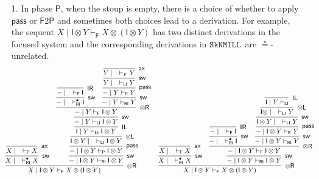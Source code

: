 \documentclass[copyright,creativecommons]{eptcs}
\theoremstyle{definition}
\newcommand{\tl}{\otimes \mathsf{L}}
\newcommand{\tr}{\otimes \mathsf{R}}
\newcommand{\pass}{\mathsf{pass}}
\newcommand{\unitl}{\mathsf{IL}}
\newcommand{\unitr}{\mathsf{IR}}
\newcommand{\ax}{\mathsf{ax}}
\newcommand{\ot}{\otimes}
\newcommand{\I}{\mathsf{I}}
\newcommand{\RI}{\mathsf{RI}}
\newcommand{\LI}{\mathsf{LI}}
\newcommand{\Pass}{\mathsf{P}}
\newcommand{\F}{\mathsf{F}}
\newcommand{\SkNMILL}{$\mathtt{SkNMILL}$}
\begin{document}
\begin{enumerate}
  \item[1.] In phase $\Pass$, when the stoup is empty, there is a choice of whether to apply $\pass$ or $\F2\Pass$ and sometimes both choices lead to a derivation. For example, the sequent $X \mid \I \ot Y \vdash_{\F} X \ot (\I \ot Y)$ has two distinct derivations in the focused system and the corresponding derivations in \SkNMILL\ are $\circeq$-unrelated.
  \begin{equation*}
  \small
\hspace*{-5mm}
    \begin{array}{cc}
    \infer[\tr]{X \mid \I \ot Y \vdash_{\F} X \ot (\I \ot Y)}{
    \infer[\mathsf{sw}]{X \mid \quad \vdash^{\bullet}_{\RI} X}{
      \infer[\ax]{X \mid \quad \vdash_{\F} X}{}
    }
      &
      \infer[\mathsf{sw}]{{-} \mid \I \ot Y \vdash_{\RI} \I \ot Y}{
        \infer[\pass]{{-} \mid \I \ot Y \vdash_{\Pass} \I \ot Y}{
          \infer[\tl]{\I \ot Y \mid \quad \vdash_{\LI} \I \ot Y}{
            \infer[\unitl]{\I \mid Y \vdash_{\LI} \I \ot Y}{
              \infer[\mathsf{sw}]{{-} \mid Y \vdash_{\LI} \I \ot Y}{
                \infer[\tr]{{-} \mid Y \vdash_{\F} \I \ot Y}{
                  \infer[\mathsf{sw}]{{-} \mid \quad \vdash^{\bullet}_{\RI} \I}{
                    \infer[\unitr]{{-} \mid \quad \vdash_{\F} \I}{}
                  }
                  &
                  \infer[\mathsf{sw}]{{-} \mid Y \vdash_{\RI} Y}{
                    \infer[\pass]{{-} \mid Y \vdash_{\Pass} Y}{
                      \infer[\mathsf{sw}]{Y \mid \quad \vdash_{\LI} Y}{
                        \infer[\ax]{Y \mid \quad \vdash_{F} Y}{}
                      }
                    }
                  }
                }
              }
            }
          }
        }
      }
    }
    &
    \infer[\tr]{X \mid \I \ot Y \vdash_{\F} X \ot (\I \ot Y)}{
      \infer[\mathsf{sw}]{X \mid \quad \vdash^{\bullet}_{\RI} X}{
        \infer[\ax]{X \mid \quad \vdash_{\F} X}{}
      }
      &
      \infer[\mathsf{sw}]{{-} \mid \I \ot Y \vdash_{\RI} \I \ot Y}{
        \infer[\tr]{{-} \mid \I \ot Y \vdash_{\F} \I \ot Y}{
          \infer[\mathsf{sw}]{{-} \mid \quad \vdash^{\bullet}_{\RI} \I}{
            \infer[\unitr]{{-} \mid \quad \vdash_{\F} \I}{}
          }
          &
          \infer[\mathsf{sw}]{{-} \mid \I \ot Y \vdash_{\RI} Y}{
            \infer[\pass]{{-} \mid \I \ot Y \vdash_{\Pass} Y}{
              \infer[\mathsf{sw}]{\I \ot Y \mid \quad \vdash_{\LI} Y}{
                \infer[\tl]{\I \ot \mid \quad \vdash_{\LI} Y}{
                  \infer[\unitl]{\I \mid Y \vdash_{\LI}}{
}}}}}}}}
\end{array}
\end{equation*}
\end{enumerate}
\end{document}
